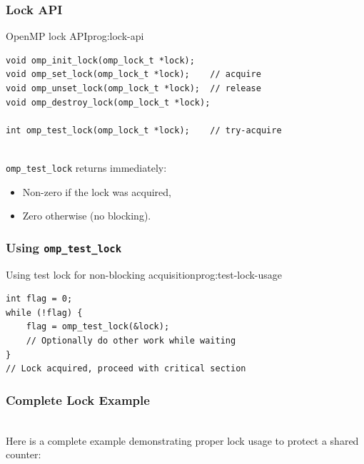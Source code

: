 \subsubsection{Lock API}

\begin{ppprogram}{OpenMP lock API}{prog:lock-api}
\begin{lstlisting}[language=OpenMP]
void omp_init_lock(omp_lock_t *lock);
void omp_set_lock(omp_lock_t *lock);    // acquire
void omp_unset_lock(omp_lock_t *lock);  // release
void omp_destroy_lock(omp_lock_t *lock);

int omp_test_lock(omp_lock_t *lock);    // try-acquire
\end{lstlisting}
\end{ppprogram}

\begin{ppkey}
\\ \texttt{omp\_test\_lock} returns immediately:
\begin{itemize}
    \item Non-zero if the lock was acquired,
    \item Zero otherwise (no blocking).
\end{itemize}
\end{ppkey}

\subsubsection{Using \texttt{omp\_test\_lock}}

\begin{ppprogram}{Using test lock for non-blocking acquisition}{prog:test-lock-usage}
\begin{lstlisting}[language=OpenMP]
int flag = 0;
while (!flag) {
    flag = omp_test_lock(&lock);
    // Optionally do other work while waiting
}
// Lock acquired, proceed with critical section
\end{lstlisting}
\end{ppprogram}

\subsubsection{Complete Lock Example}

\begin{ppexample}
\\ Here is a complete example demonstrating proper lock usage to protect a shared counter:
\end{ppexample}

